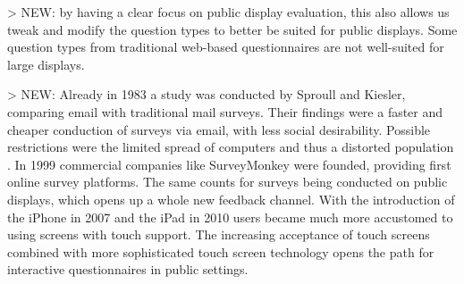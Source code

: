 
	> NEW: by having a clear focus on public display evaluation, this also allows us tweak and modify the question types to better be suited for public displays. Some question types from traditional web-based questionnaires are not well-suited for large displays.



	> NEW: %
	Already in 1983 a study was conducted by Sproull and Kiesler, comparing email with traditional mail surveys. Their findings were a faster and cheaper conduction of surveys via email, with less social desirability. Possible restrictions were the limited spread of computers and thus a distorted population \cite{sproull1986reducing}. In 1999 commercial companies like SurveyMonkey were founded, providing first online survey platforms. The same counts for surveys being conducted on public displays, which opens up a whole new feedback channel. With the introduction of the iPhone in 2007 and the iPad in 2010 users became much more accustomed to using screens with touch support. The increasing acceptance of touch screens combined with more sophisticated touch screen technology opens the path for interactive questionnaires in public settings. 






